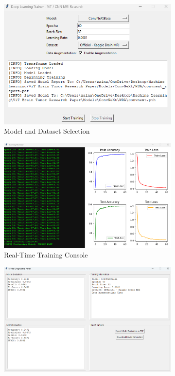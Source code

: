 \documentclass[11pt]{article}
\begin{document}
\begin{figure}[H]
\centering

\begin{subfigure}[t]{0.32\textwidth}
\includegraphics[width=\linewidth]{figures/selection.png}
\caption{Model and Dataset Selection}
\label{fig:gui-window1}
\end{subfigure}
\hfill
\begin{subfigure}[t]{0.32\textwidth}
\includegraphics[width=\linewidth]{figures/traininglog.png}
\caption{Real-Time Training Console}
\label{fig:gui-window2}
\end{subfigure}
\hfill
\begin{subfigure}[t]{0.32\textwidth}
\includegraphics[width=\linewidth]{figures/diagnostics.png}

\end{subfigure}
\end{figure}
\end{document}
